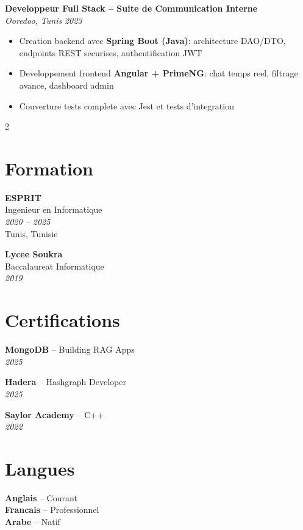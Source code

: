 \documentclass[10pt,a4paper]{article}
\begin{document}
{\vspace{3pt}
\textbf{Developpeur Full Stack -- Suite de Communication Interne}\\[1pt]
\textit{Ooredoo, Tunis} \hfill \textit{2023}
\begin{itemize}[leftmargin=12pt,itemsep=1pt,topsep=1pt,parsep=0pt]
  \item Creation backend avec \textbf{Spring Boot (Java)}: architecture DAO/DTO, endpoints REST securises, authentification JWT
  \item Developpement frontend \textbf{Angular + PrimeNG}: chat temps reel, filtrage avance, dashboard admin
  \item Couverture tests complete avec Jest et tests d'integration
\end{itemize}

}

\vspace{3pt}
\begin{multicols}{2}

\section*{Formation}
\vspace{2pt}
{\small
\textbf{ESPRIT}\\[1pt]
Ingenieur en Informatique\\[1pt]
\textit{2020 -- 2025}\\[1pt]
Tunis, Tunisie

\vspace{3pt}
\textbf{Lycee Soukra}\\[1pt]
Baccalaureat Informatique\\[1pt]
\textit{2019}
}

\vspace{3pt}
\section*{Certifications}
\vspace{2pt}
{\small
\textbf{MongoDB} -- Building RAG Apps\\[1pt]
\textit{2025}

\vspace{2pt}
\textbf{Hadera} -- Hashgraph Developer\\[1pt]
\textit{2025}

\vspace{2pt}
\textbf{Saylor Academy} -- C++\\[1pt]
\textit{2022}
}

\columnbreak

\section*{Langues}
\vspace{2pt}
{\small
\textbf{Anglais} -- Courant\\[2pt]
\textbf{Francais} -- Professionnel\\[2pt]
\textbf{Arabe} -- Natif
}

\end{multicols}
\end{document}
